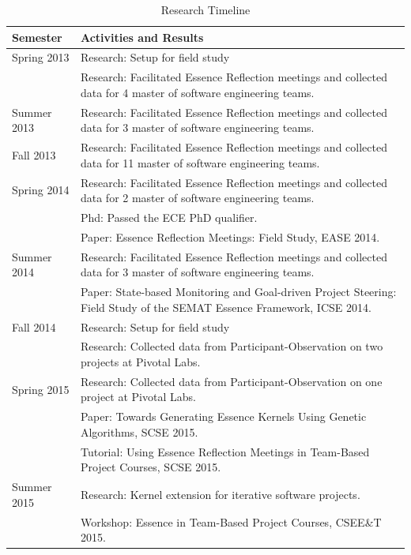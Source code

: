 \documentclass[preprint,12pt,3p]{elsarticle}
\begin{document}
\begin{table}[H]
\caption{Research Timeline}
\label{ResearchTimeline}
\centering
\begin{tabular}{|p{1.00in}|p{5.00in}|}
\hline
Semester    & Activities and Results  \\ \hline
Spring 2013 & Research: Setup for field study \\
            & Research: Facilitated Essence Reflection meetings and collected data for 4 master of software engineering teams. \\ \hline
Summer 2013 & Research: Facilitated Essence Reflection meetings and collected data for 3 master of software engineering teams.  \\ \hline
Fall 2013   & Research: Facilitated Essence Reflection meetings and collected data for 11 master of software engineering teams.  \\ \hline
Spring 2014 & Research: Facilitated Essence Reflection meetings and collected data for 2 master of software engineering teams.\\ 
            & Phd: Passed the ECE PhD qualifier.\\ 
            & Paper: Essence Reflection Meetings: Field Study, EASE 2014. \cite{EASE2014} \\ \hline
Summer 2014 & Research: Facilitated Essence Reflection meetings and collected data for 3 master of software engineering teams.\\ 
            & Paper: State-based Monitoring and Goal-driven Project Steering: Field Study of the SEMAT Essence Framework, ICSE 2014. \cite{ICSE2014} \\ \hline
Fall 2014   & Research: Setup for field study \\
            & Research: Collected data from Participant-Observation on two projects at Pivotal Labs.  \\ \hline
Spring 2015 & Research: Collected data from Participant-Observation on one project at Pivotal Labs.\\ 
            & Paper: Towards Generating Essence Kernels Using Genetic Algorithms, SCSE 2015. \cite{SCSE2015} \\ 
            & Tutorial: Using Essence Reflection Meetings in Team-Based Project Courses, SCSE 2015.\cite{SCSE2015Tutorial} \\ \hline
Summer 2015 & Research: Kernel extension for iterative software projects.\\ 
            & Workshop: Essence in Team-Based Project Courses, CSEE\&T 2015. \cite{CSEET2015Workshop} \\ \hline                     
\end{tabular}
\end{table}
\end{document}
